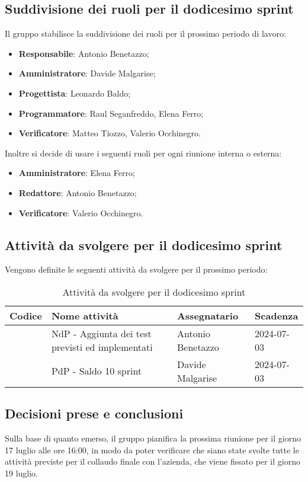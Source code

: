 \documentclass[italian,12pt]{article}
\begin{document}
\subsection{Suddivisione dei ruoli per il dodicesimo sprint}
Il gruppo stabilisce la suddivisione dei ruoli per il prossimo periodo di lavoro:
\begin{itemize}
	\item \textbf{Responsabile}: Antonio Benetazzo;
	\item \textbf{Amministratore}: Davide Malgarise;
	\item \textbf{Progettista}: Leonardo Baldo;
	\item \textbf{Programmatore}: Raul Seganfreddo, Elena Ferro;
	\item \textbf{Verificatore}: Matteo Tiozzo, Valerio Occhinegro.
\end{itemize}
\newblock
Inoltre si decide di usare i seguenti ruoli per ogni riunione interna o esterna:
\begin{itemize}
	\item \textbf{Amministratore}: Elena Ferro;
	\item \textbf{Redattore}: Antonio Benetazzo;
	\item \textbf{Verificatore}: Valerio Occhinegro.
\end{itemize}

\newpage

\subsection{Attività da svolgere per il dodicesimo sprint} %
Vengono definite le seguenti attività da svolgere per il prossimo periodo:
\begin{table}[!h]
	\centering
	\begin{tabular}{ |l||p{7cm}|l|l| }
		\hline
		\textbf{Codice}          & \textbf{Nome attività}                           & \textbf{Assegnatario} & \textbf{Scadenza} \\
		\hline
		\mySkip[86bz8e29k]       & NdP - Aggiunta dei test previsti ed implementati & Antonio Benetazzo     & 2024-07-03        \\
		\mySkip[86bz8e6dg]       & PdP - Saldo 10 sprint               				& Davide Malgarise      & 2024-07-03        \\
		\hline
	\end{tabular}
	\caption{Attività da svolgere per il dodicesimo sprint}
\end{table}

\subsection{Decisioni prese e conclusioni}
Sulla base di quanto emerso, il gruppo pianifica la prossima riunione per il giorno 17 luglio alle ore 16:00, in modo da poter verificare che siano state svolte tutte le attività previste per il collaudo finale con l'azienda, che viene fissato per il giorno 19 luglio.
\end{document}
